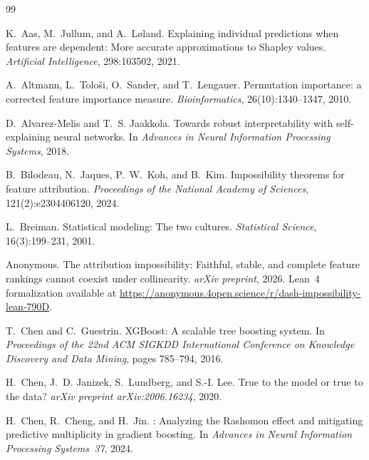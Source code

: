 \documentclass[10pt]{article}
\begin{document}
\begin{thebibliography}{99}

K.~Aas, M.~Jullum, and A.~L{\o}land.
\newblock Explaining individual predictions when features are dependent:
  More accurate approximations to {S}hapley values.
\newblock \emph{Artificial Intelligence}, 298:103502, 2021.

A.~Altmann, L.~Tolo{\v{s}}i, O.~Sander, and T.~Lengauer.
\newblock Permutation importance: a corrected feature importance measure.
\newblock \emph{Bioinformatics}, 26(10):1340--1347, 2010.

D.~Alvarez-Melis and T.~S. Jaakkola.
\newblock Towards robust interpretability with self-explaining neural networks.
\newblock In \emph{Advances in Neural Information Processing Systems}, 2018.

B.~Bilodeau, N.~Jaques, P.~W.~Koh, and B.~Kim.
\newblock Impossibility theorems for feature attribution.
\newblock \emph{Proceedings of the National Academy of Sciences},
  121(2):e2304406120, 2024.

L.~Breiman.
\newblock Statistical modeling: The two cultures.
\newblock \emph{Statistical Science}, 16(3):199--231, 2001.

Anonymous.
\newblock The attribution impossibility: Faithful, stable, and complete
  feature rankings cannot coexist under collinearity.
\newblock \emph{arXiv preprint}, 2026. Lean~4 formalization available at
  \url{https://anonymous.4open.science/r/dash-impossibility-lean-790D}.

T.~Chen and C.~Guestrin.
\newblock XGBoost: A scalable tree boosting system.
\newblock In \emph{Proceedings of the 22nd ACM SIGKDD International Conference
  on Knowledge Discovery and Data Mining}, pages 785--794, 2016.

H.~Chen, J.~D. Janizek, S.~Lundberg, and S.-I. Lee.
\newblock True to the model or true to the data?
\newblock \emph{arXiv preprint arXiv:2006.16234}, 2020.

H.~Chen, R.~Cheng, and H.~Jin.
: Analyzing the {R}ashomon effect and mitigating
  predictive multiplicity in gradient boosting.
\newblock In \emph{Advances in Neural Information Processing Systems~37}, 2024.


\end{thebibliography}
\end{document}
